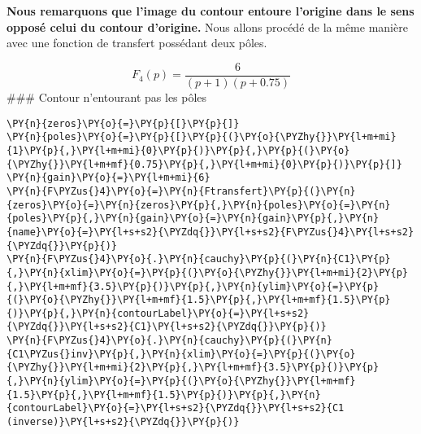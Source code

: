    \begin{center}
    \end{center}
    { \hspace*{\fill} \\}
    
    \begin{center}
    \end{center}
    { \hspace*{\fill} \\}
    
    \textbf{Nous remarquons que l'image du contour entoure l'origine dans le
sens opposé celui du contour d'origine.} Nous allons procédé de la même
manière avec une fonction de transfert possédant deux pôles.

\[
F_4(p)=\dfrac{6}{(p+1)(p+0.75)}
\] \#\#\# Contour n'entourant pas les pôles

    \begin{tcolorbox}[breakable, size=fbox, boxrule=1pt, pad at break*=1mm,colback=cellbackground, colframe=cellborder]
\begin{Verbatim}[commandchars=\\\{\}]
\PY{n}{zeros}\PY{o}{=}\PY{p}{[}\PY{p}{]}
\PY{n}{poles}\PY{o}{=}\PY{p}{[}\PY{p}{(}\PY{o}{\PYZhy{}}\PY{l+m+mi}{1}\PY{p}{,}\PY{l+m+mi}{0}\PY{p}{)}\PY{p}{,}\PY{p}{(}\PY{o}{\PYZhy{}}\PY{l+m+mf}{0.75}\PY{p}{,}\PY{l+m+mi}{0}\PY{p}{)}\PY{p}{]}
\PY{n}{gain}\PY{o}{=}\PY{l+m+mi}{6}
\PY{n}{F\PYZus{}4}\PY{o}{=}\PY{n}{Ftransfert}\PY{p}{(}\PY{n}{zeros}\PY{o}{=}\PY{n}{zeros}\PY{p}{,}\PY{n}{poles}\PY{o}{=}\PY{n}{poles}\PY{p}{,}\PY{n}{gain}\PY{o}{=}\PY{n}{gain}\PY{p}{,}\PY{n}{name}\PY{o}{=}\PY{l+s+s2}{\PYZdq{}}\PY{l+s+s2}{F\PYZus{}4}\PY{l+s+s2}{\PYZdq{}}\PY{p}{)}
\PY{n}{F\PYZus{}4}\PY{o}{.}\PY{n}{cauchy}\PY{p}{(}\PY{n}{C1}\PY{p}{,}\PY{n}{xlim}\PY{o}{=}\PY{p}{(}\PY{o}{\PYZhy{}}\PY{l+m+mi}{2}\PY{p}{,}\PY{l+m+mf}{3.5}\PY{p}{)}\PY{p}{,}\PY{n}{ylim}\PY{o}{=}\PY{p}{(}\PY{o}{\PYZhy{}}\PY{l+m+mf}{1.5}\PY{p}{,}\PY{l+m+mf}{1.5}\PY{p}{)}\PY{p}{,}\PY{n}{contourLabel}\PY{o}{=}\PY{l+s+s2}{\PYZdq{}}\PY{l+s+s2}{C1}\PY{l+s+s2}{\PYZdq{}}\PY{p}{)}
\PY{n}{F\PYZus{}4}\PY{o}{.}\PY{n}{cauchy}\PY{p}{(}\PY{n}{C1\PYZus{}inv}\PY{p}{,}\PY{n}{xlim}\PY{o}{=}\PY{p}{(}\PY{o}{\PYZhy{}}\PY{l+m+mi}{2}\PY{p}{,}\PY{l+m+mf}{3.5}\PY{p}{)}\PY{p}{,}\PY{n}{ylim}\PY{o}{=}\PY{p}{(}\PY{o}{\PYZhy{}}\PY{l+m+mf}{1.5}\PY{p}{,}\PY{l+m+mf}{1.5}\PY{p}{)}\PY{p}{,}\PY{n}{contourLabel}\PY{o}{=}\PY{l+s+s2}{\PYZdq{}}\PY{l+s+s2}{C1 (inverse)}\PY{l+s+s2}{\PYZdq{}}\PY{p}{)}
\end{Verbatim}
\end{tcolorbox}

